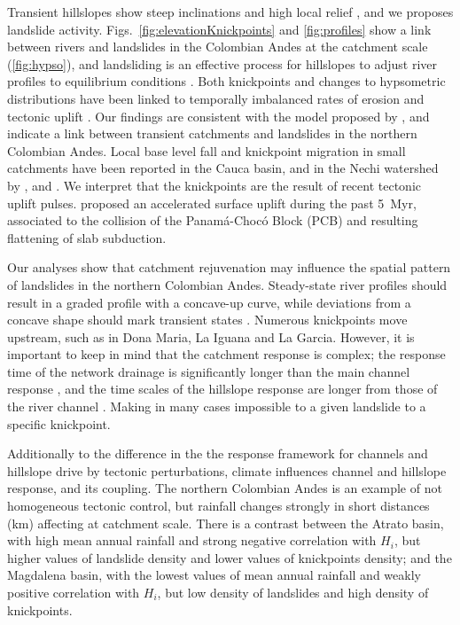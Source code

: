 \documentclass[draft]{agujournal2019}
\begin{document}
\par Transient hillslopes show steep inclinations and high local relief \cite{Whipple1999, matos2016}, and we proposes landslide activity. Figs.~\ref{fig:elevationKnickpoints} and \ref{fig:profiles} show a link between rivers and landslides in the Colombian Andes at the catchment scale (\ref{fig:hypso}), and landsliding is an effective process for hillslopes to adjust river profiles to equilibrium conditions \cite{burbank1996}. Both knickpoints and changes to hypsometric distributions have been linked to temporally imbalanced rates of erosion and tectonic uplift \cite{perez-pena2009}. Our findings are consistent with the model proposed by , and indicate a link between transient catchments and landslides in the northern Colombian Andes. Local base level fall and knickpoint migration in small catchments have been reported in the Cauca basin, and in the Nechi watershed by ,  and . We interpret that the knickpoints are the result of recent tectonic uplift pulses.  proposed an accelerated surface uplift during the past 5~Myr, associated to the collision of the Panamá-Chocó Block (PCB) and resulting flattening of slab subduction.

\par Our analyses show that catchment rejuvenation may influence the spatial pattern of landslides in the northern Colombian Andes. Steady-state river profiles should result in a graded profile with a concave-up curve, while deviations from a concave shape should mark transient states \cite{Whipple1999, Wobus2006}. Numerous knickpoints move upstream, such as in Dona Maria, La Iguana and La Garcia. However, it is important to keep in mind that the catchment response is complex; the response time of the network drainage is significantly longer than the main channel response \cite{Willett2014}, and the time scales of the hillslope response are longer from those of the river channel \cite{fiona2019}. Making in many cases impossible to a given landslide to a specific knickpoint.

\par Additionally to the difference in the the response framework for channels and hillslope drive by tectonic perturbations, climate influences channel and hillslope response, and its coupling. The northern Colombian Andes is an example of not homogeneous tectonic control, but rainfall changes strongly in short distances (km) affecting at catchment scale. There is a contrast between the Atrato basin, with high mean annual rainfall and strong negative correlation with $H_i$, but higher values of landslide density and lower values of knickpoints density; and the Magdalena basin,  with the lowest values of mean annual rainfall and weakly positive correlation with $H_i$, but low density of landslides and high density of knickpoints. 
\end{document}
